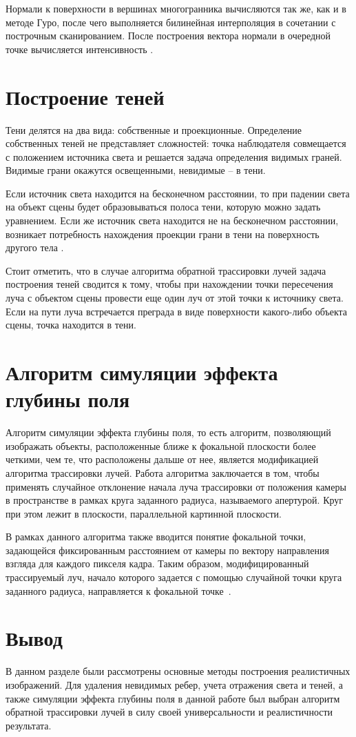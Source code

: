 Нормали к поверхности в вершинах многогранника вычисляются так же, как и в методе Гуро, после чего выполняется билинейная интерполяция в сочетании с построчным сканированием. После построения вектора нормали в очередной точке вычисляется интенсивность \cite{lit5}.

\section{Построение теней}
Тени делятся на два вида: собственные и проекционные. Определение собственных теней не представляет сложностей: точка наблюдателя совмещается с положением источника света и решается задача определения видимых граней. Видимые грани окажутся освещенными, невидимые -- в тени.

Если источник света находится на бесконечном расстоянии, то при падении света на объект сцены будет образовываться полоса тени, которую можно задать уравнением. Если же источник света находится не на бесконечном расстоянии, возникает потребность нахождения проекции грани в тени на поверхность другого тела \cite{lit6}.

Стоит отметить, что в случае алгоритма обратной трассировки лучей задача построения теней сводится к тому, чтобы при нахождении точки пересечения луча с объектом сцены провести еще один луч от этой точки к источнику света. Если на пути луча встречается преграда в виде поверхности какого-либо объекта сцены, точка находится в тени.

\section{Алгоритм симуляции эффекта глубины поля}
Алгоритм симуляции эффекта глубины поля, то есть алгоритм, позволяющий изображать объекты, расположенные ближе к фокальной плоскости более четкими, чем те, что расположены дальше от нее, является модификацией алгоритма трассировки лучей. Работа алгоритма заключается в том, чтобы применять случайное отклонение начала луча трассировки от положения камеры в пространстве в рамках круга заданного радиуса, называемого апертурой. Круг при этом лежит в плоскости, параллельной картинной плоскости.

В рамках данного алгоритма также вводится понятие фокальной точки, задающейся фиксированным расстоянием от камеры по вектору направления взгляда для каждого пикселя кадра. Таким образом, модифицированный трассируемый луч, начало которого задается с помощью случайной точки круга заданного радиуса, направляется к фокальной точке~\cite{DOF}.


\section*{Вывод}

В данном разделе были рассмотрены основные методы построения реалистичных изображений. Для удаления невидимых ребер, учета отражения света и теней, а также симуляции эффекта глубины поля в данной работе был выбран алгоритм обратной трассировки лучей в силу своей универсальности и реалистичности результата.

\clearpage
